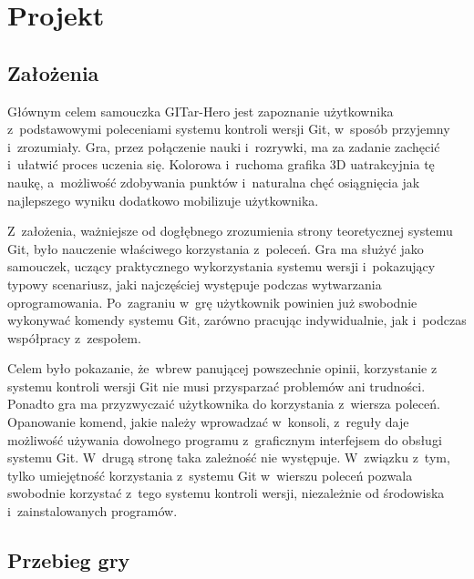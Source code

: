 \documentclass[12pt,a4paper,polish,thesis]{dcsbook}
\begin{document}
{	\chapter{Projekt}

	\section{Założenia}
		
	Głównym celem samouczka GITar-Hero jest zapoznanie użytkownika z~podstawowymi poleceniami systemu kontroli wersji Git, w~sposób przyjemny i~zrozumiały. Gra, przez połączenie nauki i~rozrywki, ma za zadanie zachęcić i~ułatwić proces uczenia się. Kolorowa i~ruchoma grafika 3D uatrakcyjnia tę naukę, a~możliwość zdobywania punktów i~naturalna chęć osiągnięcia jak najlepszego wyniku dodatkowo mobilizuje użytkownika.

	Z~założenia, ważniejsze od dogłębnego zrozumienia strony teoretycznej systemu Git, było nauczenie właściwego korzystania z~poleceń. Gra ma służyć jako samouczek, uczący praktycznego wykorzystania systemu wersji i~pokazujący typowy scenariusz, jaki najczęściej występuje podczas wytwarzania oprogramowania. Po~zagraniu w~grę użytkownik powinien już swobodnie wykonywać komendy systemu Git, zarówno pracując indywidualnie, jak i~podczas współpracy z~zespołem. 
	
	Celem było pokazanie, że~wbrew panującej powszechnie opinii, korzystanie z systemu kontroli wersji Git nie musi przysparzać problemów ani trudności. Ponadto gra ma przyzwyczaić użytkownika do korzystania z~wiersza poleceń. Opanowanie komend, jakie należy wprowadzać w~konsoli, z~reguły daje możliwość używania dowolnego programu z~graficznym interfejsem do obsługi systemu Git. W~drugą stronę taka zależność nie występuje. W~związku z~tym, tylko umiejętność korzystania z~systemu Git w~wierszu poleceń pozwala swobodnie korzystać z~tego systemu kontroli wersji, niezależnie od środowiska i~zainstalowanych programów.
	 
	\section{Przebieg gry}
	
}
\end{document}
